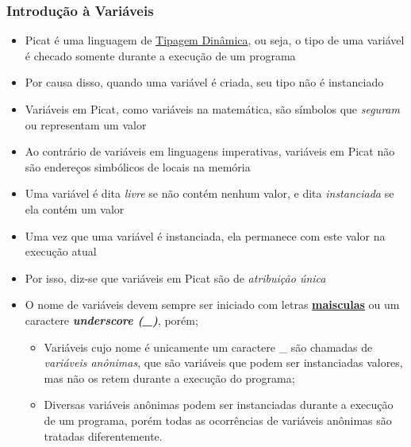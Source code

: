 \begin{frame}[c,allowframebreaks=0.53]
	\frametitle{Introdução à Variáveis}
	
	\begin{itemize}
		
		\item Picat é uma linguagem de \underline{Tipagem Dinâmica}, ou seja, o tipo de uma variável 
		é checado somente durante a execução de um programa
		
		\item Por causa disso, quando uma variável é criada, seu tipo não é instanciado
		
		\item Variáveis em Picat, como variáveis na matemática, são símbolos que \textit{seguram} ou 
		representam um valor
		
		\item Ao contrário de variáveis em linguagens imperativas, variáveis em Picat não são
		endereços simbólicos de locais na memória
		
		\item Uma variável é dita \textit{livre} se não contém nenhum valor, e dita
		\textit{instanciada} se ela contém um valor
		
		\item Uma vez que uma variável é instanciada, ela permanece com este valor na 
		execução atual
		
		\item Por isso, diz-se que variáveis em Picat são de \textit{atribuição única}
		
		\item O nome de variáveis devem sempre ser iniciado com letras \textbf{\underline{maisculas}}
		ou um caractere \textbf{\textit{underscore (\_)}}, porém;
		
		\begin{itemize}
			
			\item Variáveis cujo nome é unicamente um caractere \_ são chamadas de 
			\textit{variáveis anônimas}, que são variáveis que podem ser instanciadas valores,
			mas não os retem durante a execução do programa;
			
			\item Diversas variáveis anônimas podem ser instanciadas durante a execução de um
			programa, porém todas as ocorrências de variáveis anônimas são tratadas 
			diferentemente.
		\end{itemize}
		
	\end{itemize}
	
\end{frame}

